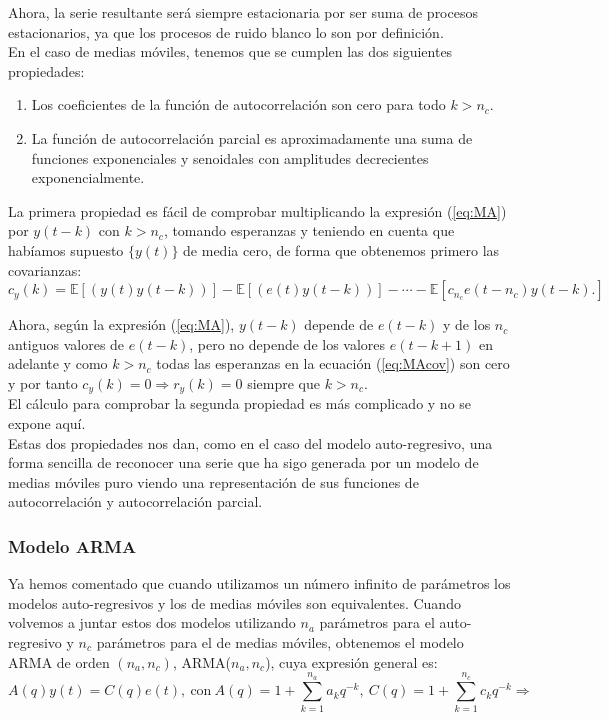 Ahora, la serie resultante será siempre estacionaria por ser suma de procesos estacionarios, ya que los procesos de ruido blanco lo son por definición.\\

En el caso de medias móviles, tenemos que se cumplen las dos siguientes propiedades:
\begin{enumerate}
\item Los coeficientes de la función de autocorrelación son cero para todo $k>n_c$.
\item La función de autocorrelación parcial es aproximadamente una suma de funciones exponenciales y senoidales con amplitudes decrecientes exponencialmente.
\end{enumerate}

La primera propiedad es fácil de comprobar multiplicando la expresión (\ref{eq:MA}) por $y(t-k)$ con $k>n_c$, tomando esperanzas y teniendo en cuenta que habíamos supuesto $\{y(t)\}$ de media cero, de forma que obtenemos primero las covarianzas:
\begin{equation} \label{eq:MAcov}
	c_y(k) = \mathbb{E}[(y(t)y(t-k))] -  \mathbb{E}[(e(t)y(t-k))] - \cdots - \mathbb{E}[c_{n_c} e(t-n_c) y(t-k).]
\end{equation}

Ahora, según la expresión (\ref{eq:MA}), $y(t-k)$ depende de $e(t-k)$ y de los $n_c$ antiguos valores de $e(t-k)$, pero no depende de los valores $e(t-k+1)$ en adelante y como $k>n_c$ todas las esperanzas en la ecuación (\ref{eq:MAcov}) son cero y por tanto $c_y(k) = 0 \Rightarrow r_y(k) = 0$ siempre que $k>n_c$.\\

El cálculo para comprobar la segunda propiedad es más complicado y no se expone aquí.\\

Estas dos propiedades nos dan, como en el caso del modelo auto-regresivo, una forma sencilla de reconocer una serie que ha sigo generada por un modelo de medias móviles puro viendo una representación de sus funciones de autocorrelación y autocorrelación parcial.

\subsubsection{Modelo ARMA}

Ya hemos comentado que cuando utilizamos un número infinito de parámetros los modelos auto-regresivos y los de medias móviles son equivalentes. Cuando volvemos a juntar estos dos modelos utilizando $n_a$ parámetros para el auto-regresivo y $n_c$ parámetros para el de medias móviles, obtenemos el modelo ARMA de orden $(n_a,n_c)$, ARMA($n_a,n_c$), cuya expresión general es:
\[	A(q)y(t) = C(q)e(t),\ \text{con}\ A(q) = 1 + \sum_{k=1}^{n_a} a_kq^{-k},\ C(q) = 1 + \sum_{k=1}^{n_c} c_k q^{-k} \Rightarrow	\]

